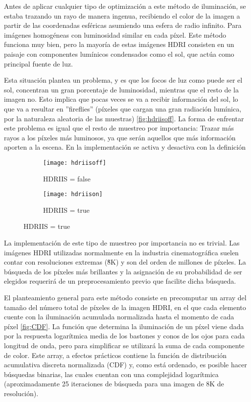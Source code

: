 Antes de aplicar cualquier tipo de optimización a este método de iluminación, se estaba trazando un rayo de manera ingenua, recibiendo el color de la imagen a partir de las coordenadas esféricas asumiendo una esfera de radio infinito. Para imágenes homogéneas con luminosidad similar en cada píxel. Este método funciona muy bien, pero la mayoría de estas imágenes HDRI consisten en un paisaje con componentes lumínicos condensados como el sol, que actúa como principal fuente de luz.

Esta situación plantea un problema, y es que los focos de luz como puede ser el sol, concentran un gran porcentaje de luminosidad, mientras que el resto de la imagen no. Esto implica que pocas veces se va a recibir información del sol, lo que va a resultar en ''fireflies'' (píxeles que cargan una gran radiación lumínica, por la naturaleza aleatoria de las muestras) \autoref{fig:hdriisoff}. La forma de enfrentar este problema es igual que el resto de muestreo por importancia: Trazar más rayos a los píxeles más luminosos, ya que serán aquellos que más información aporten a la escena. En la implementación se activa y desactiva con la definición 

\begin{figure}[H]
\label{fig:hdriis}
	\centering
  \begin{subfigure}[b]{0.4\textwidth}
	\texttt{[image: hdriisoff]}
	\caption{HDRIIS = false}
	\label{fig:hdriisoff}
  \end{subfigure}
  \hfill
  \begin{subfigure}[b]{0.4\textwidth}
	\texttt{[image: hdriison]}
	\caption{HDRIIS = true}
	\label{fig:hdriison}
  \end{subfigure}
\end{figure}

La implementación de este tipo de muestreo por importancia no es trivial. Las imágenes HDRI utilizadas normalmente en la industria cinematográfica suelen contar con resoluciones extremas (\~8K) y son del orden de millones de píxeles. La búsqueda de los píxeles más brillantes y la asignación de su probabilidad de ser elegidos requerirá de un preprocesamiento previo que facilite dicha búsqueda.

El planteamiento general para este método consiste en precomputar un array del tamaño del número total de píxeles de la imagen HDRI, en el que cada elemento cuente con la iluminación acumulada normalizada hasta el momento de cada píxel \autoref{fig:CDF}.
La función que determina la iluminación de un píxel viene dada por la respuesta logarítmica media de los bastones y conos de los ojos para cada longitud de onda, pero para simplificar se utilizará la suma de cada componente de color. Este array, a efectos prácticos contiene la función de distribución acumulativa discreta normalizada (CDF) y, como está ordenado, es posible hacer búsquedas binarias, las cuales cuentan con una complejidad logarítmica (aproximadamente 25 iteraciones de búsqueda para una imagen de 8K de resolución).


